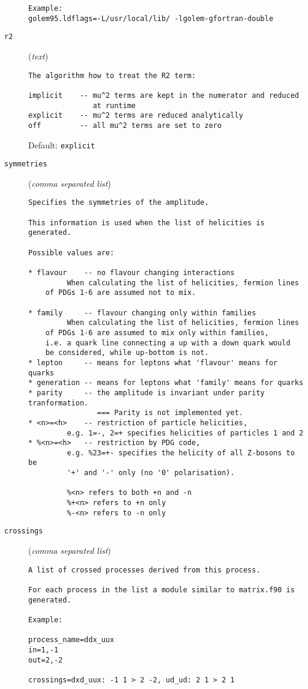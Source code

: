 \begin{description}
\begin{verbatim}
Example:
golem95.ldflags=-L/usr/local/lib/ -lgolem-gfortran-double
\end{verbatim}
\item[\texttt{r2}] (\textit{text})
\begin{verbatim}
The algorithm how to treat the R2 term:

implicit    -- mu^2 terms are kept in the numerator and reduced
               at runtime
explicit    -- mu^2 terms are reduced analytically
off         -- all mu^2 terms are set to zero
\end{verbatim}
Default: \verb|explicit|
\item[\texttt{symmetries}] (\textit{comma separated list})
\begin{verbatim}
Specifies the symmetries of the amplitude.

This information is used when the list of helicities is generated.

Possible values are:

* flavour    -- no flavour changing interactions
         When calculating the list of helicities, fermion lines
    of PDGs 1-6 are assumed not to mix.

* family     -- flavour changing only within families
         When calculating the list of helicities, fermion lines
    of PDGs 1-6 are assumed to mix only within families,
    i.e. a quark line connecting a up with a down quark would
    be considered, while up-bottom is not.
* lepton     -- means for leptons what 'flavour' means for quarks
* generation -- means for leptons what 'family' means for quarks
* parity     -- the amplitude is invariant under parity tranformation.
                === Parity is not implemented yet.
* <n>=<h>    -- restriction of particle helicities,
         e.g. 1=-, 2=+ specifies helicities of particles 1 and 2
* %<n>=<h>   -- restriction by PDG code,
         e.g. %23=+- specifies the helicity of all Z-bosons to be
         '+' and '-' only (no '0' polarisation).

         %<n> refers to both +n and -n
         %+<n> refers to +n only
         %-<n> refers to -n only
\end{verbatim}
\item[\texttt{crossings}] (\textit{comma separated list})
\begin{verbatim}
A list of crossed processes derived from this process.

For each process in the list a module similar to matrix.f90 is
generated.

Example:

process_name=ddx_uux
in=1,-1
out=2,-2

crossings=dxd_uux: -1 1 > 2 -2, ud_ud: 2 1 > 2 1
\end{verbatim}
\end{description}
